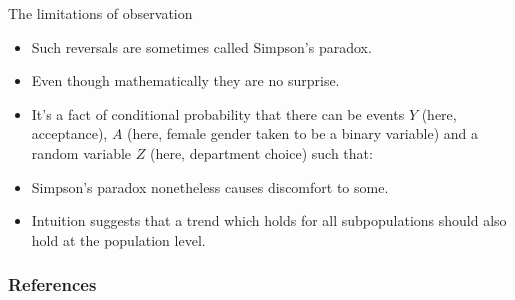 \documentclass[handout]{beamer}
\begin{document}
\begin{frame}{The limitations of observation}
\scriptsize{

\begin{itemize}

\item Such reversals are sometimes called Simpson's paradox. 
\item Even though mathematically they are no surprise.
\item It's a fact of conditional probability that there can be events $Y$ (here, acceptance), $A$ (here, female gender taken to be a binary variable) and a random variable $Z$ (here, department choice) such that:
\item Simpson's paradox nonetheless causes discomfort to some.

\item Intuition suggests that a trend which holds for all subpopulations should also hold at the population level.


\end{itemize}

} 

\end{frame}



\begin{frame}[allowframebreaks]\scriptsize
\frametitle{References}


%
\end{frame}  









\end{document}
